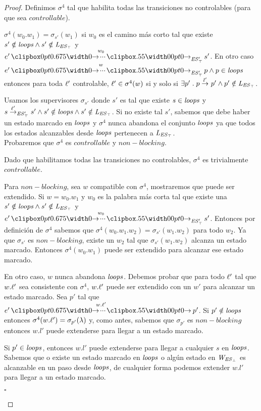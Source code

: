 \begin{proof}
Definimos $\sigma^4$ tal que habilita todas las transiciones no controlables (para que sea $controllable$).

$\sigma^4(w_0.w_1) = \sigma_{s'}(w_1)$ si $w_0$ es el camino más corto tal que existe $s' \notin \mathit{loops} \wedge s'\notin \mathit{L_{\mathit{\mathit{ES}_{\top}}}}$ y $e' \runw{w_0}{\unexploredToTop{\structure'}} s'$.
En otro caso $e' \runw{w}{\unexploredToTop{\structure'}} p \wedge p \in \SCC$ entonces para toda $\ell'$ controlable, $\ell' \in\sigma^4(w)$ si y solo si $\exists  p' \;.\; p \overset{l'}{\rightarrow}_{} p' \wedge p' \notin \mathit{L_{\mathit{\mathit{ES}_{\top}}}}$.

Usamos los supervisores $\sigma_{s'}$ donde $s'$ es tal que existe $s \in \mathit{loops}$ y $s\overset{\ell'}{\rightarrow}_{\mathit{\mathit{ES}'_{\top}}} s'\wedge s' \notin \mathit{loops} \wedge s'\notin \mathit{L_{\mathit{\mathit{ES}_{\top}}}}$. Si no existe tal $s'$, sabemos que debe haber un estado marcado en $\mathit{loops}$ y $\sigma^4$ nunca abandona el conjunto $\mathit{loops}$ ya que todos los estados alcanzables desde $\mathit{loops}$ pertenecen a $\mathit{L_{\mathit{\mathit{ES}_{\top}}}}$.\\

Probaremos que $\sigma^4$ es $controllable$ y $non-blocking$.

Dado que habilitamos todas las transiciones no controlables, $\sigma^4$ es trivialmente $controllable$.

Para $non-blocking$, sea $w$ compatible con $\sigma^4$, mostraremos que puede ser extendido. Si $w = w_0.w_1$ y $w_0$ es la palabra más corta tal que existe una $s' \notin \mathit{loops} \wedge s' \notin \mathit{L_{\mathit{\mathit{ES}_{\top}}}}$ y $e' \runw{w_0}{\unexploredToTop{\structure'}} s'$. Entonces por definición de $\sigma^4$ sabemos que  $\sigma^4(w_0.w_1.w_2) = \sigma_{s'}(w_1.w_2)$ para todo $w_2$. Ya que $\sigma_{s'}$ es $non-blocking$, existe un $w_2$ tal que $\sigma_{s'}(w_1.w_2)$ alcanza un estado marcado. Entonces $\sigma^4(w_0.w_1)$ puede ser extendido para alcanzar ese estado marcado. 

En otro caso, $w$ nunca abandona $\mathit{loops}$. Debemos probar que para todo $\ell'$ tal que $w.\ell'$ sea consistente con $\sigma^4$, $w.\ell'$ puede ser extendido con un $w'$ para alcanzar un estado marcado. Sea $p'$ tal que $e' \runw{w.\l'}{} p'$. Si $p' \notin \mathit{loops}$ entonces $\sigma^4(w.\ell') = \sigma_{p'}(\lambda)$ y, como antes, sabemos que $\sigma_{p'}$ es $non-blocking$ entonces $w.l'$ puede extenderse para llegar a un estado marcado.

Si $p' \in \mathit{loops}$, entonces $w.l'$ puede extenderse para llegar a cualquier $s$ en $\mathit{loops}$. Sabemos que o existe un estado marcado en $\mathit{loops}$ o algún estado en $\mathit{W_{\mathit{\mathit{ES}_{\bot}}}}$ es alcanzable en un paso desde $\mathit{loops}$, de cualquier forma podemos extender $w.l'$ para llegar a un estado marcado.\\
\begin{flushright}
	$\square$
\end{flushright}
\end{proof}


